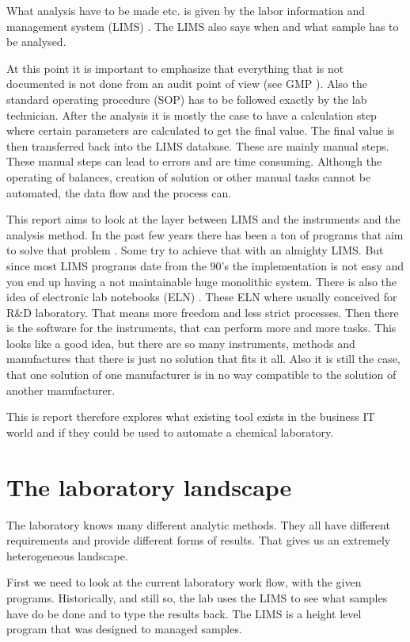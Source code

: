 \documentclass[paper=a4,twoside=false,BCOR=0mm,DIV=calc,fontsize=12pt]{scrartcl}
\begin{document}
What analysis have to be made etc. is given by the labor information and management system (LIMS) \cite{lims}. The LIMS also says when and what sample has to be analysed.

At this point it is important to emphasize that everything that is not documented is not done from an audit point of view (see GMP \cite{gmp}). Also the standard operating procedure (SOP) has to be followed exactly by the lab technician.
After the analysis it is mostly the case to have a calculation step where certain parameters are calculated to get the final value. The final value is then transferred back into the LIMS database. These are mainly manual steps. These manual steps can lead to errors and are time consuming.
Although the operating of balances, creation of solution or other manual tasks cannot be automated, the data flow and the process can.

This report aims to look at the layer between LIMS and the instruments and the analysis method. In the past few years there has been a ton of programs that aim to solve that problem \cite{}.  Some try to achieve that with an almighty LIMS. But since most LIMS programs date from the 90's the implementation is not easy and you end up having a not maintainable huge monolithic system. There is also the idea of electronic lab notebooks (ELN) \cite{eln}. These ELN where usually conceived for R\&D laboratory. That means more freedom and less strict processes.
Then there is the software for the instruments, that can perform more and more tasks. This looks like a good idea, but there are so many instruments, methods and manufactures that there is just no solution that fits it all. Also it is still the case, that one solution of one manufacturer is in no way compatible to the solution of another manufacturer.

This is report therefore explores what existing tool exists in the business IT world and if they could be used to automate a chemical laboratory.

\section{The laboratory landscape}
The laboratory knows many different analytic methods. They all have different requirements and provide different forms of results. That gives us an extremely heterogeneous landscape. 

First we need to look at the current laboratory work flow, with the given programs. Historically, and still so, the lab uses the LIMS to see what samples have do be done and to type the results back. The LIMS is a height level program that was designed to managed samples.
\end{document}
